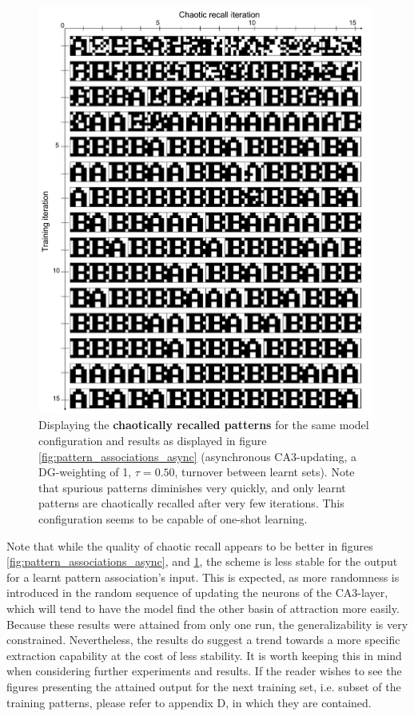 \begin{figure}
    \centering
    \includegraphics[width=11cm]{fig/AB-chaotic-recall-async-tm0-dgw1-tau050}
    \caption{Displaying the \textbf{chaotically recalled patterns} for the same model configuration and results as displayed in figure \ref{fig:pattern_associations_async} (asynchronous CA3-updating, a DG-weighting of 1, $\tau=0.50$, turnover between learnt sets). Note that spurious patterns diminishes very quickly, and only learnt patterns are chaotically recalled after very few iterations. This configuration seems to be capable of one-shot learning.}
    \label{fig:chaotic_recall_async}
\end{figure}

Note that while the quality of chaotic recall appears to be better in figures \ref{fig:pattern_associations_async}, and \ref{fig:chaotic_recall_async}, the scheme is less stable for the output for a learnt pattern association's input. This is expected, as more randomness is introduced in the random sequence of updating the neurons of the CA3-layer, which will tend to have the model find the other basin of attraction more easily. Because these results were attained from only one run, the generalizability is very constrained. Nevertheless, the results do suggest a trend towards a more specific extraction capability at the cost of less stability. It is worth keeping this in mind when considering further experiments and results. If the reader wishes to see the figures presenting the attained output for the next training set, i.e. subset of the training patterns, please refer to appendix D, in which they are contained.

